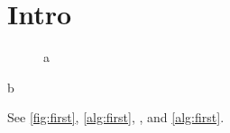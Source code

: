 \documentclass[twocolumn,unicode]{wrapper}
\begin{document}
\wrapperclass\articleclass\layoutmode\hypermode
\section{Intro}
\begin{figure}\label{fig:first}a\end{figure}
\begin{algorithm}\label{alg:first}b\end{algorithm}
See \autoref{fig:first}, \cref{alg:first}, , and \vref{alg:first}.
\end{document}
